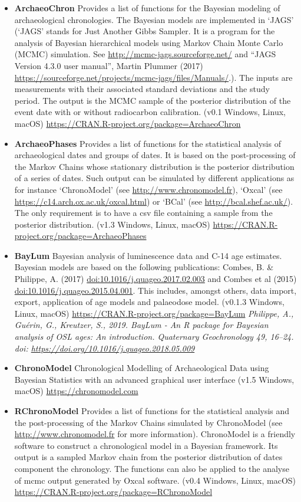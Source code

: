 \documentclass[]{article}
\providecommand{\tightlist}{%
  \setlength{\itemsep}{0pt}\setlength{\parskip}{0pt}}
\begin{document}
\begin{itemize}
\tightlist
\item
  \textbf{ArchaeoChron}
  Provides a list of functions for the Bayesian modeling of archaeological chronologies. The Bayesian models are implemented in `JAGS' (`JAGS' stands for Just Another Gibbs Sampler. It is a program for the analysis of Bayesian hierarchical models using Markov Chain Monte Carlo (MCMC) simulation. See \url{http://mcmc-jags.sourceforge.net/} and ``JAGS Version 4.3.0 user manual'', Martin Plummer (2017) \url{https://sourceforge.net/projects/mcmc-jags/files/Manuals/}.). The inputs are measurements with their associated standard deviations and the study period. The output is the MCMC sample of the posterior distribution of the event date with or without radiocarbon calibration.
  (v0.1 \textbar{} Windows, Linux, macOS)
  \url{https://CRAN.R-project.org/package=ArchaeoChron}
\item
  \textbf{ArchaeoPhases}
  Provides a list of functions for the statistical analysis of archaeological dates and groups of dates. It is based on the post-processing of the Markov Chains whose stationary distribution is the posterior distribution of a series of dates. Such output can be simulated by different applications as for instance `ChronoModel' (see \url{http://www.chronomodel.fr}), `Oxcal' (see \url{https://c14.arch.ox.ac.uk/oxcal.html}) or `BCal' (see \url{http://bcal.shef.ac.uk/}). The only requirement is to have a csv file containing a sample from the posterior distribution.
  (v1.3 \textbar{} Windows, Linux, macOS)
  \url{https://CRAN.R-project.org/package=ArchaeoPhases}
\item
  \textbf{BayLum}
  Bayesian analysis of luminescence data and C-14 age estimates. Bayesian models are based on the following publications: Combes, B. \& Philippe, A. (2017) \url{doi:10.1016/j.quageo.2017.02.003} and Combes et al (2015) \url{doi:10.1016/j.quageo.2015.04.001}. This includes, amongst others, data import, export, application of age models and palaeodose model.
  (v0.1.3 \textbar{} Windows, Linux, macOS)
  \url{https://CRAN.R-project.org/package=BayLum}
  \emph{Philippe, A., Guérin, G., Kreutzer, S., 2019. BayLum - An R package for Bayesian analysis of OSL ages: An introduction. Quaternary Geochronology 49, 16--24. doi: \url{https://doi.org/10.1016/j.quageo.2018.05.009}}
\item
  \textbf{ChronoModel}
  Chronological Modelling of Archaeological Data using Bayesian Statistics with an advanced graphical user interface
  (v1.5 \textbar{} Windows, macOS)
  \url{https://chronomodel.com}
\item
  \textbf{RChronoModel}
  Provides a list of functions for the statistical analysis and the post-processing of the Markov Chains simulated by ChronoModel (see \url{http://www.chronomodel.fr} for more information). ChronoModel is a friendly software to construct a chronological model in a Bayesian framework. Its output is a sampled Markov chain from the posterior distribution of dates component the chronology. The functions can also be applied to the analyse of mcmc output generated by Oxcal software.
  (v0.4 \textbar{} Windows, Linux, macOS)
  \url{https://CRAN.R-project.org/package=RChronoModel}
\end{itemize}
\end{document}
